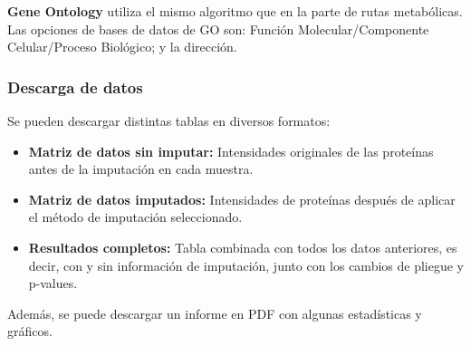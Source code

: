 \documentclass[nochap]{config/ejercicios}
\begin{document}
\textbf{Gene Ontology} utiliza el mismo algoritmo que en la parte de rutas metabólicas. Las opciones de bases de datos de GO son: Función Molecular/Componente Celular/Proceso Biológico; y la dirección.

\subsubsection{Descarga de datos}
Se pueden descargar distintas tablas en diversos formatos:
\begin{itemize}
\item \textbf{Matriz de datos sin imputar:} Intensidades originales de las proteínas antes de la imputación en cada muestra.
\item \textbf{Matriz de datos imputados:} Intensidades de proteínas después de aplicar el método de imputación seleccionado.
\item \textbf{Resultados completos:} Tabla combinada con todos los datos anteriores, es decir, con y sin información de imputación, junto con los cambios de pliegue y p-values.
\end{itemize}

Además, se puede descargar un informe en PDF con algunas estadísticas y gráficos.
\end{document}
